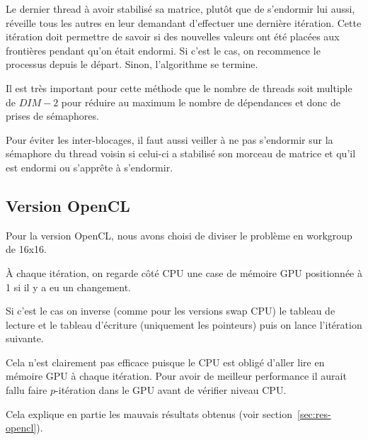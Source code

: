 Le dernier thread à avoir stabilisé sa matrice, plutôt que de
s'endormir lui aussi, réveille tous les autres en leur demandant
d'effectuer une dernière itération. Cette itération doit permettre de
savoir si des nouvelles valeurs ont été placées aux frontières pendant
qu'on était endormi. Si c'est le cas, on recommence le processus
depuis le départ. Sinon, l'algorithme se termine.
\medskip

Il est très important pour cette méthode que le nombre de threads soit
multiple de $DIM-2$ pour réduire au maximum le nombre de dépendances
et donc de prises de sémaphores.
\medskip

Pour éviter les inter-blocages, il faut aussi veiller à ne pas
s'endormir sur la sémaphore du thread voisin si celui-ci a stabilisé
son morceau de matrice et qu'il est endormi ou s'apprête à s'endormir.
\medskip

\subsection{Version OpenCL}

Pour la version OpenCL, nous avons choisi de diviser le problème en
workgroup de 16x16.

À chaque itération, on regarde côté CPU une case de mémoire GPU
positionnée à 1 si il y a eu un changement.

Si c'est le cas on inverse (comme pour les versions swap CPU) le
tableau de lecture et le tableau d'écriture (uniquement les pointeurs)
puis on lance l'itération suivante.

Cela n'est clairement pas efficace puisque le CPU est obligé d'aller
lire en mémoire GPU à chaque itération. Pour avoir de meilleur
performance il aurait fallu faire $p$-itération dans le GPU avant de
vérifier niveau CPU.

Cela explique en partie les mauvais résultats obtenus (voir section~\ref{sec:res-opencl}).
